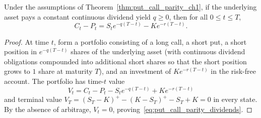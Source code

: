 \begin{corollary}
\label{cor:put_call_parity_dividends}
Under the assumptions of Theorem~\ref{thm:put_call_parity_ch1}, if the underlying asset pays a constant continuous dividend yield $q \ge 0$, then for all $0 \le t \le T$,
\begin{equation}
\label{eq:put_call_parity_dividends}
    C_t - P_t = S_t e^{-q(T-t)} - K e^{-r(T-t)}.
\end{equation}
\end{corollary}

\begin{proof}
At time $t$, form a portfolio consisting of a long call, a short put, a short position in $e^{-q(T-t)}$ shares of the underlying asset (with continuous dividend obligations compounded into additional short shares so that the short position grows to $1$ share at maturity $T$), and an investment of $K e^{-r(T-t)}$ in the risk-free account. The portfolio has time-$t$ value
\[
    V_t = C_t - P_t - S_t e^{-q(T-t)} + K e^{-r(T-t)}
\]
and terminal value $V_T = (S_T - K)^+ - (K - S_T)^+ - S_T + K = 0$ in every state. By the absence of arbitrage, $V_t = 0$, proving~\eqref{eq:put_call_parity_dividends}.
\end{proof}

